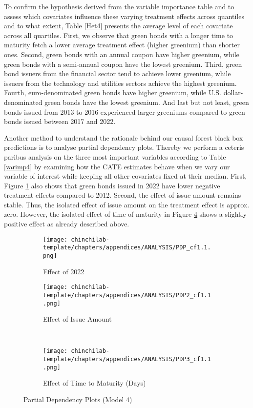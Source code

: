 To confirm the hypothesis derived from the variable importance table and to assess which covariates influence these varying treatment effects across quantiles and to what extent, Table \ref{Het4} presents the average level of each covariate across all quartiles. First, we observe that green bonds with a longer time to maturity fetch a lower average treatment effect (higher greenium) than shorter ones. Second, green bonds with an annual coupon have higher greenium, while green bonds with a semi-annual coupon have the lowest greenium. Third, green bond issuers from the financial sector tend to achieve lower greenium, while issuers from the technology and utilities sectors achieve the highest greenium. Fourth, euro-denominated green bonds have higher greenium, while U.S. dollar-denominated green bonds have the lowest greenium. And last but not least, green bonds issued from 2013 to 2016 experienced larger greeniums compared to green bonds issued between 2017 and 2022.

Another method to understand the rationale behind our causal forest black box predictions is to analyse partial dependency plots. Thereby we perform a ceteris paribus analysis on the three most important variables according to Table \ref{varimp4} by examining how the CATE estimates behave when we vary our variable of interest while keeping all other covariates fixed at their median. First, Figure \ref{pdp2022} also shows that green bonds issued in 2022 have lower negative treatment effects compared to 2012. Second, the effect of issue amount remains stable. Thus, the isolated effect of issue amount on the treatment effect is approx. zero. However, the isolated effect of time of maturity in Figure \ref{pdpttm} shows a slightly positive effect as already described above.

\begin{figure}[H]
\centering
   \begin{subfigure}[b]{0.45\textwidth} \centering
    \texttt{[image: chinchilab-template/chapters/appendices/ANALYSIS/PDP\_cf1.1.png]}   
    \caption{Effect of 2022}
    \label{pdp2022} 
\end{subfigure}
\begin{subfigure}[b]{0.5\textwidth} \centering
    \texttt{[image: chinchilab-template/chapters/appendices/ANALYSIS/PDP2\_cf1.1.png]}
   \caption{Effect of Issue Amount}
   \label{pdpia}
\end{subfigure}
\\
\begin{subfigure}[b]{0.5\textwidth} \centering
    \texttt{[image: chinchilab-template/chapters/appendices/ANALYSIS/PDP3\_cf1.1.png]}
   \caption{Effect of Time to Maturity (Days)}
   \label{pdpttm}
\end{subfigure}
\caption{Partial Dependency Plots (Model 4)}
\end{figure}

